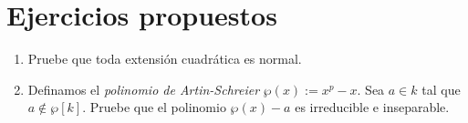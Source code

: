 \documentclass[11pt, reqno]{amsart}
\begin{document}
\pagebreak
\appendix
\section{Ejercicios propuestos}
\begin{enumerate}
	\item\lookright
		Pruebe que toda extensión cuadrática es normal.
	\item Definamos el \emph{polinomio de Artin-Schreier} $\wp(x) := x^p - x$.
		Sea $a \in k$ tal que $a \notin \wp[k]$.
		Pruebe que el polinomio $\wp(x) - a$ es irreducible e inseparable.
\end{enumerate}

\nocite{jacobson:basic, nagata:fields}
\printbibliography
\end{document}

